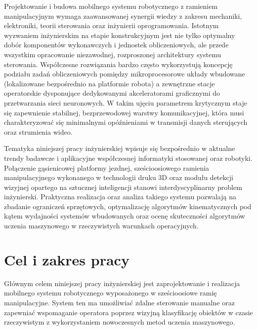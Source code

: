 \documentclass[11pt]{extreport}
\begin{document}
Projektowanie i budowa mobilnego systemu robotycznego z ramieniem manipulacyjnym wymaga zaawansowanej synergii wiedzy z zakresu mechaniki, elektroniki, teorii sterowania oraz inżynierii oprogramowania. Istotnym wyzwaniem inżynierskim na etapie konstrukcyjnym jest nie tylko optymalny dobór komponentów wykonawczych i jednostek obliczeniowych, ale przede wszystkim opracowanie niezawodnej, rozproszonej architektury systemu sterowania. Współczesne rozwiązania bardzo często wykorzystują koncepcję podziału zadań obliczeniowych pomiędzy mikroprocesorowe układy wbudowane (lokalizowane bezpośrednio na platformie robota) a zewnętrzne stacje operatorskie dysponujące dedykowanymi akceleratorami graficznymi do przetwarzania sieci neuronowych. W takim ujęciu parametrem krytycznym staje się zapewnienie stabilnej, bezprzewodowej warstwy komunikacyjnej, która musi charakteryzować się minimalnymi opóźnieniami w transmisji danych sterujących oraz strumienia wideo.

Tematyka niniejszej pracy inżynierskiej wpisuje się bezpośrednio w aktualne trendy badawcze i aplikacyjne współczesnej informatyki stosowanej oraz robotyki. Połączenie gąsienicowej platformy jezdnej, sześcioosiowego ramienia manipulacyjnego wykonanego w technologii druku 3D oraz modułu detekcji wizyjnej opartego na sztucznej inteligencji stanowi interdyscyplinarny problem inżynierski. Praktyczna realizacja oraz analiza takiego systemu pozwalają na zbadanie ograniczeń sprzętowych, optymalizację algorytmów kinematycznych pod kątem wydajności systemów wbudowanych oraz ocenę skuteczności algorytmów uczenia maszynowego w rzeczywistych warunkach operacyjnych.


\chapter{Cel i zakres pracy}

Głównym celem niniejszej pracy inżynierskiej jest zaprojektowanie i realizacja mobilnego systemu robotycznego wyposażonego w sześcioosiowe ramię manipulacyjne. System ten ma umożliwiać zdalne sterowanie manualne oraz zapewniać wspomaganie operatora poprzez wizyjną klasyfikację obiektów w czasie rzeczywistym z wykorzystaniem nowoczesnych metod uczenia maszynowego.
\end{document}
